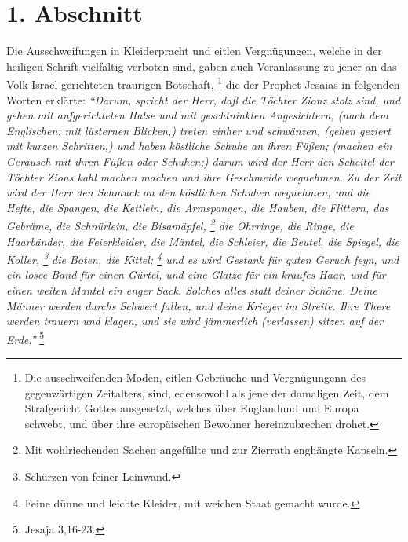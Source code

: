 \begin{description}
\end{description}
\normalsize

\section{1. Abschnitt} \label{kap15_ab1}

Die Ausschweifungen in Kleiderpracht und eitlen Vergnügungen, welche in der
heiligen Schrift vielfältig verboten sind, gaben auch
Veranlassung zu jener an
das Volk Israel gerichteten traurigen Botschaft,
\footnote{
    Die ausschweifenden Moden, eitlen Gebräuche und Vergnügungenn des gegenwärtigen
    Zeitalters, sind,
    edensowohl als jene der damaligen Zeit, dem Strafgericht Gottes ausgesetzt,
    welches über Englandnnd und Europa schwebt, und über ihre europäischen
    Bewohner hereinzubrechen drohet.}
die der Prophet Jesaias in folgenden Worten erklärte:
\textit{
    "`Darum, spricht der Herr, daß die Töchter Zionz stolz sind, und gehen mit  anfgerichteten Halse und mit geschtninkten
    Angesichtern, (nach dem Englischen: mit lüsternen Blicken,) treten einher und
    schwänzen, (gehen geziert mit kurzen Schritten,) und haben köstliche Schuhe an
    ihren Füßen; (machen ein Geräusch mit ihren Füßen oder Schuhen;) darum wird der
    Herr den Scheitel der Töchter Zions kahl machen machen und ihre Geschmeide
    wegnehmen. Zu der Zeit wird der Herr den Schmuck an den köstlichen Schuhen
    wegnehmen, und die Hefte, die Spangen, die Kettlein, die Armspangen, die
    Hauben, die Flittern, das Gebräme, die Schnürlein, die Bisamäpfel,
    \footnote{
        Mit wohlriechenden Sachen angefüllte und zur Zierrath
        enghängte Kapseln.}
    die Ohrringe, die Ringe, die Haarbänder, die Feierkleider,
    die Mäntel, die Schleier, die Beutel, die Spiegel, die Koller,
    \footnote{Schürzen von feiner Leinwand.}
    die Boten, die Kittel;
    \footnote{Feine dünne und leichte
        Kleider, mit weichen Staat gemacht wurde.} und es wird Gestank für guten
        Geruch feyn, und ein losee Band für einen Gürtel, und eine Glatze für ein
        kraufes Haar, und für einen weiten Mantel ein enger Sack. Solches alles
	statt deiner Schöne. Deine Männer werden durchs Schwert fallen, und deine
	Krieger im Streite. Ihre There werden trauern und klagen, und sie wird
	jämmerlich (verlassen) sitzen auf der Erde."'}
\footnote{Jesaja 3,16-23.}

\medskip

